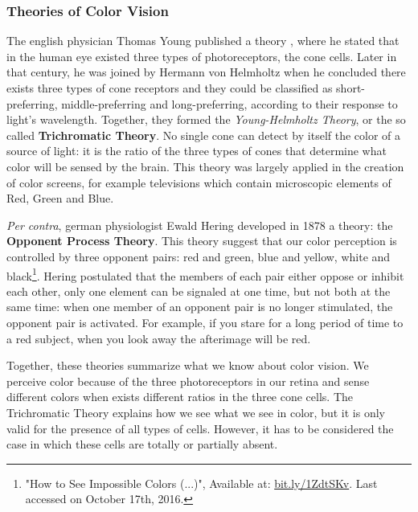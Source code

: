 \subsubsection{Theories of Color Vision}
The english physician Thomas Young published a theory \cite{Young1802}, where he stated that
in the human eye existed three types of photoreceptors, the cone cells. Later in that century, he was
joined by Hermann von Helmholtz when he concluded there exists three types of cone receptors and they could
be classified as short-preferring, middle-preferring and long-preferring, according to their response to
light’s wavelength. Together, they formed the \emph{Young-Helmholtz Theory}, or the so called \textbf{Trichromatic Theory}.
No single cone can detect by itself the color of a source of light: it is the ratio of the three types of cones that
determine what color will be sensed by the brain. This theory was largely applied in the creation of color
screens, for example televisions which contain microscopic elements of Red, Green and Blue. \par
\emph{Per contra}, german physiologist Ewald Hering developed in 1878 a theory: the
\textbf{Opponent Process Theory}. This theory suggest that our color perception is controlled by three
opponent pairs: red and green, blue and yellow, white and black\footnote{"How to See Impossible Colors (...)", Available at: \url{bit.ly/1ZdtSKv}. Last accessed on October 17th, 2016.}. Hering postulated that the members of each
pair either oppose or inhibit each other, only one element can be signaled at one time, but not both at the
same time: when one member of an opponent pair is no longer stimulated, the opponent pair is activated. For
example, if you stare for a long period of time to a red subject, when you look away the afterimage will be
red. \par
Together, these theories summarize what we know about color vision. We perceive color because of the three
photoreceptors in our retina and sense different colors when exists different ratios in the three cone
cells. The Trichromatic Theory explains how we see what we see in color, but it is only valid for the
presence of all types of cells. However, it has to be considered the case in which these cells are totally or partially absent.
%
